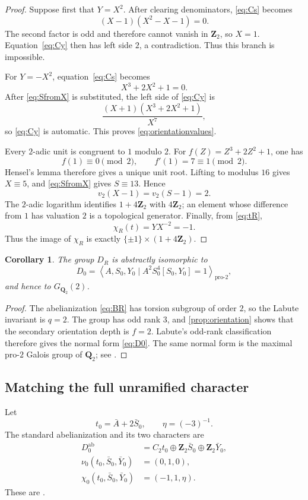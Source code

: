 \documentclass[11pt]{article}
\numberwithin{equation}{section}
\newtheorem{corollary}[theorem]{Corollary}
\theoremstyle{definition}
\theoremstyle{remark}
\newcommand{\Q}{\mathbf Q}
\newcommand{\Z}{\mathbf Z}
\newcommand{\GQpro}{G_{\Q_2}(2)}
\newcommand{\ab}{\mathrm{ab}}
\newcommand{\DR}{D_R}
\newcommand{\Dzero}{D_0}
\newcommand{\chiR}{\chi_R}
\newcommand{\chiZero}{\chi_0}
\newcommand{\angles}[1]{\left\langle #1\right\rangle}
\begin{document}
\begin{proof}
Suppose first that \(Y=X^2\).  After clearing denominators,
\cref{eq:Cs} becomes
\[
  (X-1)(X^2-X-1)=0.
\]
The second factor is odd and therefore cannot vanish in \(\Z_2\), so
\(X=1\).  Equation~\eqref{eq:Cy} then has left side \(2\), a contradiction.
Thus this branch is impossible.

For \(Y=-X^2\), equation~\eqref{eq:Cs} becomes
\[
  X^3+2X^2+1=0.
\]
After \cref{eq:SfromX} is substituted, the left side of \cref{eq:Cy} is
\[
  \frac{(X+1)(X^3+2X^2+1)}{X^7},
\]
so \cref{eq:Cy} is automatic.  This proves
\cref{eq:orientationvalues}.

Every \(2\)-adic unit is congruent to \(1\) modulo \(2\).  For
\(f(Z)=Z^3+2Z^2+1\), one has
\[
  f(1)\equiv0\pmod2,\qquad f'(1)=7\equiv1\pmod2.
\]
Hensel's lemma therefore gives a unique unit root.  Lifting to modulus
\(16\) gives \(X\equiv5\), and \cref{eq:SfromX} gives
\(S\equiv13\).  Hence
\[
  v_2(X-1)=v_2(S-1)=2.
\]
The \(2\)-adic logarithm identifies \(1+4\Z_2\) with \(4\Z_2\); an element
whose difference from \(1\) has valuation \(2\) is a topological generator.
Finally, from \cref{eq:tR},
\[
  \chiR(t)=YX^{-2}=-1.
\]
Thus the image of \(\chiR\) is exactly
\(\{\pm1\}\times(1+4\Z_2)\).
\end{proof}

\begin{corollary}\label{cor:abstractD0}
The group \(\DR\) is abstractly isomorphic to
\begin{equation}\label{eq:D0}
  \Dzero=
  \angles{A,S_0,Y_0\mid A^2S_0^4[S_0,Y_0]=1}_{\mathrm{pro}\text{-}2},
\end{equation}
and hence to \(\GQpro\).
\end{corollary}

\begin{proof}
The abelianization \cref{eq:BR} has torsion subgroup of order \(2\), so the
Labute invariant is \(q=2\).  The group has odd rank \(3\), and
\cref{prop:orientation} shows that the secondary orientation depth is
\(f=2\).  Labute's odd-rank classification
\cite[Theorems~4 and~8]{Labute} therefore gives the normal form
\cref{eq:D0}.  The same normal form is the maximal pro-\(2\) Galois group of
\(\Q_2\); see \cite[Lemma~3.4]{RT}.
\end{proof}

\subsection{Matching the full unramified character}

Let
\[
  t_0=\bar A+2\bar S_0,\qquad \eta=(-3)^{-1}.
\]
The standard abelianization and its two characters are
\begin{align}
  \Dzero^\ab
   &=C_2t_0\oplus\Z_2\bar S_0\oplus\Z_2\bar Y_0,\label{eq:B0}\\
  \nu_0(t_0,\bar S_0,\bar Y_0)&=(0,1,0),\label{eq:nu0}\\
  \chiZero(t_0,\bar S_0,\bar Y_0)&=(-1,1,\eta).\label{eq:chi0}
\end{align}
These are \cite[(3.4)--(3.6)]{RT}.
\end{document}
